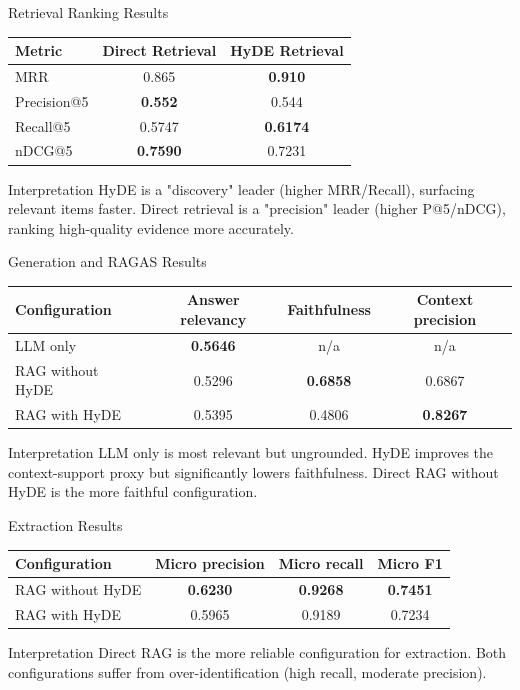 \documentclass[aspectratio=169,11pt]{beamer}
\newcommand{\na}{n/a}
\begin{document}
\begin{frame}{Retrieval Ranking Results}
\centering
\small
\begin{tabular}{lcc}
\toprule
Metric & Direct Retrieval & HyDE Retrieval \\
\midrule
MRR & 0.865 & \textbf{0.910} \\
Precision@5 & \textbf{0.552} & 0.544 \\
Recall@5 & 0.5747 & \textbf{0.6174} \\
nDCG@5 & \textbf{0.7590} & 0.7231 \\
\bottomrule
\end{tabular}

\vspace{0.35cm}
\begin{block}{Interpretation}
HyDE is a "discovery" leader (higher MRR/Recall), surfacing relevant items faster. Direct retrieval is a "precision" leader (higher P@5/nDCG), ranking high-quality evidence more accurately.
\end{block}
\end{frame}

\begin{frame}{Generation and RAGAS Results}
\centering
\small
\setlength{\tabcolsep}{5pt}
\begin{tabular}{lccc}
\toprule
Configuration & Answer relevancy & Faithfulness & Context precision \\
\midrule
LLM only & \textbf{0.5646} & \na & \na \\
RAG without HyDE & 0.5296 & \textbf{0.6858} & 0.6867 \\
RAG with HyDE & 0.5395 & 0.4806 & \textbf{0.8267} \\
\bottomrule
\end{tabular}

\vspace{0.35cm}
\begin{block}{Interpretation}
LLM only is most relevant but ungrounded. HyDE improves the context-support proxy but significantly lowers faithfulness. Direct RAG without HyDE is the more faithful configuration.
\end{block}
\end{frame}

\begin{frame}{Extraction Results}
\centering
\small
\begin{tabular}{lccc}
\toprule
Configuration & Micro precision & Micro recall & Micro F1 \\
\midrule
RAG without HyDE & \textbf{0.6230} & \textbf{0.9268} & \textbf{0.7451} \\
RAG with HyDE & 0.5965 & 0.9189 & 0.7234 \\
\bottomrule
\end{tabular}

\vspace{0.35cm}
\begin{block}{Interpretation}
Direct RAG is the more reliable configuration for extraction. Both configurations suffer from over-identification (high recall, moderate precision).
\end{block}
\end{frame}
\end{document}
